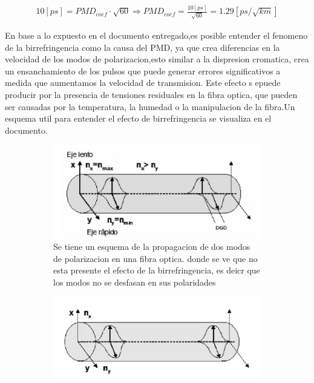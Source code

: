 \begin{enumerate}
\begin{itemize}
	\begin{align}
		10[ps] = PMD_{coef} \cdot \sqrt{60} \Rightarrow PMD_{coef} = \frac{10[ps]}{\sqrt{60}} =1.29 [ps/\sqrt{km}]
	\end{align}
\end{itemize}
En base a lo expuesto en el documento entregado,es posible entender el fenomeno de la birrefringencia como la causa del PMD, ya que crea diferencias en la velocidad de los modos de polarizacion,esto similar a la dispresion cromatica, crea un ensanchamiento de los pulsos que puede generar errores significativos a medida que aumentamos la velocidad de transmision. Este efecto s epuede producir por la presencia de tensiones residuales en la fibra optica, que pueden ser causadas por la temperatura, la humedad o la manipulacion de la fibra.Un esquema util para entender el efecto de birrefringencia se visualiza en el documento.
\begin{figure}
	\centering
	\begin{subfigure}{0.4\textwidth}
		\includegraphics[width=\textwidth]{img/P5_1.png}
		\caption{Se tiene un esquema de la propagacion de dos modos de polarizacion en una fibra optica. donde se ve que no esta presente el efecto de la birrefringencia, es deicr que los modos no se desfasan en sus polaridades}
		\label{fig:first}
	\end{subfigure}
	\hfill
	\begin{subfigure}{0.4\textwidth}
		\includegraphics[width=\textwidth]{img/P5_2.png}

\end{subfigure}
\end{figure}
\end{enumerate}
